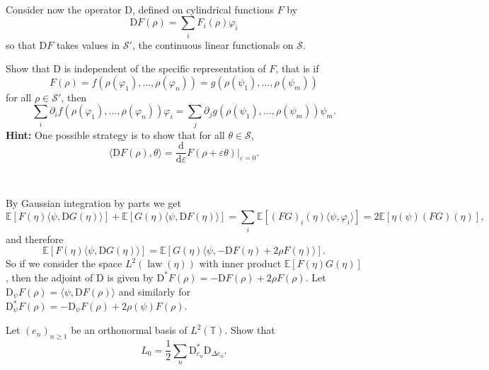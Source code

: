 \documentclass[a4paper,11pt]{article}
\newcommand{\mathD}{\mathrm{D}}
\newcommand{\mathd}{\mathrm{d}}
\newcommand{\tmop}[1]{\ensuremath{\operatorname{#1}}}
\newcommand{\tmtextbf}[1]{{\bfseries{#1}}}
\newcommand{\CS}{\mathscr{S}}
\begin{document}
\

Consider now the operator $\mathD$, defined on cylindrical functions $F$ by
\begin{equation}
  \mathD F (\rho) = \sum_i F_i (\rho) \varphi_i
\end{equation}
so that $\mathD F$ takes values in $\CS'$, the continuous linear functionals
on $\CS$.

\begin{exercise}
  Show that $\mathD$ is independent of the specific representation of $F$,
  that is if
  \[ F (\rho) = f (\rho (\varphi_1), \ldots, \rho (\varphi_n)) = g (\rho
     (\psi_1), \ldots, \rho (\psi_m)) \]
  for all $\rho \in \CS'$, then
  \[ \sum_i \partial_i f (\rho (\varphi_1), \ldots, \rho (\varphi_n))
     \varphi_i = \sum_j \partial_j g (\rho (\psi_1), \ldots, \rho (\psi_m))
     \psi_m . \]
  \tmtextbf{Hint:} One possible strategy is to show that for all $\theta \in
  \CS$,
  \[ \langle \mathD F (\rho), \theta \rangle = \frac{\mathd}{\mathd
     \varepsilon} F (\rho + \varepsilon \theta) |_{\varepsilon = 0} . \]
\end{exercise}

\

By Gaussian integration by parts we get
\[ \mathbb{E} [F (\eta) \langle \psi, \mathD G (\eta) \rangle] +\mathbb{E}
   [G (\eta) \langle \psi, \mathD F (\eta) \rangle] = \sum_i \mathbb{E} [(F
   G)_i (\eta) \langle \psi, \varphi_i \rangle] = 2\mathbb{E} [\eta (\psi)
   (FG) (\eta)], \]
and therefore
\[
   \mathbb{E} [F (\eta) \langle \psi, \mathD G (\eta) \rangle] =\mathbb{E}[G (\eta) \langle \psi, - \mathD F (\eta) + 2 \rho F (\eta) \rangle].
\]
So if we consider the space $L^2 (\tmop{law} (\eta))$ with inner product $\mathbb{E}[F(\eta) G(\eta)]$, then the
adjoint of $\mathD$ is given by $\mathD^{\ast} F (\rho) = - \mathD F (\rho) + 2 \rho F (\rho)$. Let
$\mathD_{\psi} F(\rho) = \langle \psi, \mathD F(\rho) \rangle$ and similarly for
$\mathD^{\ast}_{\psi} F(\rho) = - \mathD_{\psi} F(\rho) + 2 \rho (\psi) F(\rho)$.

\begin{exercise}
  Let $(e_n)_{n \geqslant 1}$ be an orthonormal basis of $L^2 (\mathbb{T})$.
  Show that
  \[ L_0 = \frac{1}{2} \sum_n \mathD^{\ast}_{e_n} \mathD_{\Delta e_n} . \]
\end{exercise}

\
\end{document}

